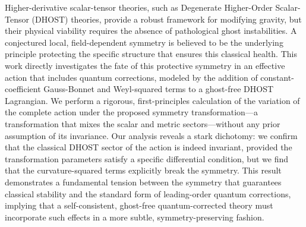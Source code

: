 \documentclass[twocolumn]{aastex631}
\begin{document}
Higher-derivative scalar-tensor theories, such as Degenerate Higher-Order Scalar-Tensor (DHOST) theories, provide a robust framework for modifying gravity, but their physical viability requires the absence of pathological ghost instabilities. A conjectured local, field-dependent symmetry is believed to be the underlying principle protecting the specific structure that ensures this classical health. This work directly investigates the fate of this protective symmetry in an effective action that includes quantum corrections, modeled by the addition of constant-coefficient Gauss-Bonnet and Weyl-squared terms to a ghost-free DHOST Lagrangian. We perform a rigorous, first-principles calculation of the variation of the complete action under the proposed symmetry transformation—a transformation that mixes the scalar and metric sectors—without any prior assumption of its invariance. Our analysis reveals a stark dichotomy: we confirm that the classical DHOST sector of the action is indeed invariant, provided the transformation parameters satisfy a specific differential condition, but we find that the curvature-squared terms explicitly break the symmetry. This result demonstrates a fundamental tension between the symmetry that guarantees classical stability and the standard form of leading-order quantum corrections, implying that a self-consistent, ghost-free quantum-corrected theory must incorporate such effects in a more subtle, symmetry-preserving fashion.
\end{document}
